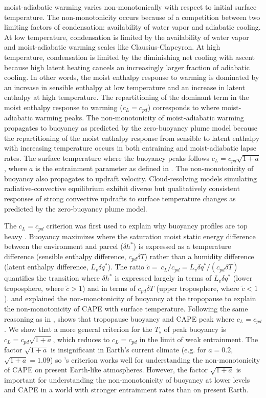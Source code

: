 \documentclass[]{ametsocV6.1}
\begin{document}
moist-adiabatic warming varies non-monotonically with respect to initial surface temperature. The non-monotonicity occurs because of a competition between two limiting factors of condensation: availability of water vapor and adiabatic cooling. At low temperature, condensation is limited by the availability of water vapor and moist-adiabatic warming scales like Clausius-Clapeyron. At high temperature, condensation is limited by the diminishing net cooling with ascent because high latent heating cancels an increasingly larger fraction of adiabatic cooling. In other words, the moist enthalpy response to warming is dominated by an increase in sensible enthalpy at low temperature and an increase in latent enthalpy at high temperature. The repartitioning of the dominant term in the moist enthalpy response to warming ($c_L=c_{pd}$) corresponds to where moist-adiabatic warming peaks. The non-monotonicity of moist-adiabatic warming propagates to buoyancy as predicted by the zero-buoyancy plume model because the repartitioning of the moist enthalpy response from sensible to latent enthalpy with increasing temperature occurs in both entraining and moist-adiabatic lapse rates. The surface temperature where the buoyancy peaks follows $c_L = c_{pd} \sqrt{1+a}$, where $a$ is the entrainment parameter as defined in \cite{romps2016}. The non-monotonicity of buoyancy also propagates to updraft velocity. Cloud-resolving models simulating radiative-convective equilibrium exhibit diverse but qualitatively consistent responses of strong convective updrafts to surface temperature changes as predicted by the zero-buoyancy plume model.

The $c_L=c_{pd}$ criterion was first used to explain why buoyancy profiles are top heavy \citep{seeley2016}. Buoyancy maximizes where the saturation moist static energy difference between the environment and parcel ($\delta h^*$) is expressed as a temperature difference (sensible enthalpy difference, $c_{pd}\delta T$) rather than a humidity difference (latent enthalpy difference, $L_v\delta q^*$). The ratio $\tilde{c}= \ c_L / c_{pd} = L_v \delta q^* / (c_{pd} \delta T)$ quantifies the transition where $\delta h^*$ is expressed largely in terms of $L_v \delta q^*$ (lower troposphere, where $\tilde{c}>1$) and in terms of $c_{pd}\delta T$ (upper troposphere, where $\tilde{c}<1$).  and \cite{romps2016} explained the non-monotonicity of buoyancy at the tropopause to explain the non-monotonicity of CAPE with surface temperature. Following the same reasoning as in \cite{seeley2016}, \cite{romps2016} shows that tropopause buoyancy and CAPE peak where $c_L = c_{pd}$. We show that a more general criterion for the $T_s$ of peak buoyancy is $c_L = c_{pd}\sqrt{1+a}$, which reduces to $c_L = c_{pd}$ in the limit of weak entrainment. The factor $\sqrt{1+a}$ is insignificant in Earth's current climate (e.g. for $a=0.2$, $\sqrt{1+a}=1.09$) so \cite{romps2016}'s criterion works well for understanding the non-monotonicity of CAPE on present Earth-like atmospheres. However, the factor $\sqrt{1+a}$ is important for understanding the non-monotonicity of buoyancy at lower levels and CAPE in a world with stronger entrainment rates than on present Earth.
\end{document}
